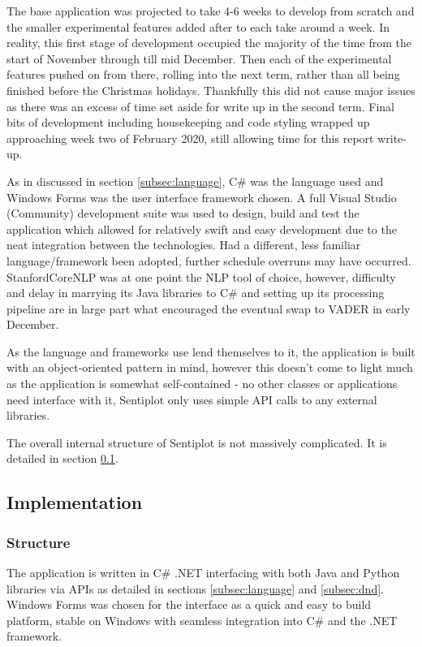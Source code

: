 \documentclass{article}
\begin{document}
{        The base application was projected to take 4-6 weeks to develop from scratch and the smaller experimental features added after to each take around a week. In reality, this first stage of development occupied the majority of the time from the start of November through till mid December. Then each of the experimental features pushed on from there, rolling into the next term, rather than all being finished before the Christmas holidays. Thankfully this did not cause major issues as there was an excess of time set aside for write up in the second term. Final bits of development including housekeeping and code styling wrapped up approaching week two of February 2020, still allowing time for this report write-up.

        As in discussed in section \ref{subsec:language}, C\# was the language used and Windows Forms was the user interface framework chosen. A full Visual Studio (Community) development suite was used to design, build and test the application which allowed for relatively swift and easy development due to the neat integration between the technologies. Had a different, less familiar language/framework been adopted, further schedule overruns may have occurred. StanfordCoreNLP was at one point the NLP tool of choice, however, difficulty and delay in marrying its Java libraries to C\# and setting up its processing pipeline are in large part what encouraged the eventual swap to VADER in early December.
        
        As the language and frameworks use lend themselves to it, the application is built with an object-oriented pattern in mind, however this doesn't come to light much as the application is somewhat self-contained - no other classes or applications need interface with it, Sentiplot only uses simple API calls to any external libraries.

        The overall internal structure of Sentiplot is not massively complicated. It is detailed in section \ref{subsec:implementation}.
    \subsection{Implementation}
    \label{subsec:implementation}
        \subsubsection{Structure}
            The application is written in C\# .NET interfacing with both Java and Python libraries via APIs as detailed in sections \ref{subsec:language} and \ref{subsec:dnd}. Windows Forms was chosen for the interface as a quick and easy to build platform, stable on Windows with seamless integration into C\# and the .NET framework.

}
\end{document}
